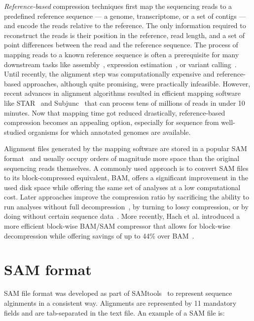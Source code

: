 \documentclass[12pt]{cmuthesis}
\makeatletter
\newcommand{\etal}{et al.\@\xspace}
\makeatother
\begin{document}
  \textit{Reference-based} compression techniques first map the sequencing reads to a predefined reference sequence --- a genome, transcriptome, or a set of contigs --- and encode the reads relative to the reference. The only information required to reconstruct the reads is their position in the reference, read length, and a set of point differences between the read and the reference sequence. The process of mapping reads to a known reference sequence is often a prerequisite for many downstream tasks like assembly~\cite{Assembly}, expression estimation~\cite{Cufflinks,RSEM}, or variant calling~\cite{GATK}. Until recently, the alignment step was computationally expensive and reference-based approaches, although quite promising, were practically infeasible. However, recent advances in alignment algorithms resulted in efficient mapping software like STAR~\cite{DobinSTAR} and Subjunc~\cite{Subread} that can process tens of millions of reads in under 10 minutes. Now that mapping time got reduced drastically, reference-based compression becomes an appealing option, especially for sequence from well-studied organisms for which annotated genomes are available.

  Alignment files generated by the mapping software are stored in a popular SAM format~\cite{SamTools} and usually occupy orders of magnitude more space than the original sequencing reads themselves. A commonly used approach is to convert SAM files to its block-compressed equivalent, BAM, offers a significant improvement in the used disk space while offering the same set of analyses at a low computational cost. Later approaches improve the compression ratio by sacrificing the ability to run analyses without full decompression~\cite{Goby,Jones2012}, by turning to lossy compression, or by doing without certain sequence data~\cite{SlimGene,CRAM}. More recently, Hach \etal introduced a more efficient block-wise BAM/SAM compressor that allows for block-wise decompression while offering savings of up to 44\% over BAM~\cite{Sahinalp2015}.

\section{SAM format}

  SAM file format was developed as part of SAMtools~\cite{SamTools} to represent sequence alginments in a consistent way. Alignments are represented by 11 mandatory fields and are tab-separated in the text file. An example of a SAM file is:
\end{document}

